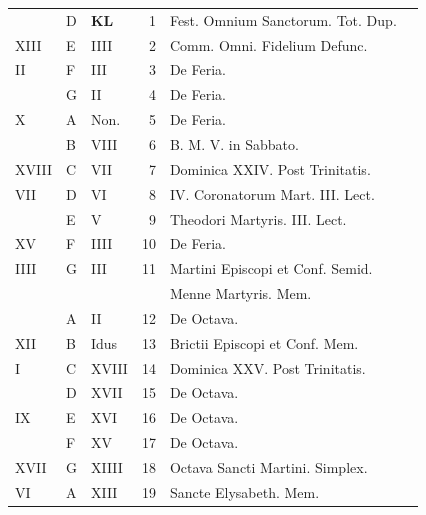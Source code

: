 \begin{center}
\begin{tabular}{l | l | l | r | l l}
\color{Red}  & D & \textbf{\color{Red} K\color{Blue}L} & 1 & Fest. Omnium Sanctorum. Tot. Dup. & \color{Red} \\
\color{Red} XIII & E & \color{Red} IIII & 2 & Comm. Omni. Fidelium Defunc. & \\
\color{Red} II & F & \color{Red} III & 3 & De Feria. & \color{Red} \\
\color{Red}  & G & \color{Red} II & 4 & De Feria. & \color{Red} \\
\color{Red} X & \color{Red} A & \color{Red} Non. & 5 & De Feria. & \color{Red} \\
\color{Red}  & B & \color{Red} VIII & 6 & B. M. V. in Sabbato. & \color{Red} \\
\color{Red} XVIII & C & \color{Red} VII & 7 & Dominica XXIV. Post Trinitatis. & \color{Red} \\
\color{Red} VII & D & \color{Red} VI & 8 & IV. Coronatorum Mart. III. Lect. & \color{Red} \\
\color{Red}  & E & \color{Red} V & 9 & Theodori Martyris. III. Lect. & \color{Red} \\
\color{Red} XV & F & \color{Red} IIII & 10 & De Feria. & \color{Red} \\
\color{Red} IIII & G & \color{Red} III & 11 & \multicolumn{2}{l}{\color{Red} Martini Episcopi et Conf. Semid. } \\
& & & & \quad \color{Red} Menne Martyris. Mem. \color{Red} \\
\color{Red}  & \color{Red} A & \color{Red} II & 12 & De Octava. & \color{Red} \\
\color{Red} XII & B & \color{Red} Idus & 13 & Brictii Episcopi et Conf. Mem. & \color{Red} \\
\color{Red} I & C & \color{Red} XVIII & 14 & Dominica XXV. Post Trinitatis. & \color{Red} \\
\color{Red}  & D & \color{Red} XVII & 15 & De Octava. & \color{Red} \\
\color{Red} IX & E & \color{Red} XVI & 16 & De Octava. & \color{Red} \\
\color{Red}  & F & \color{Red} XV & 17 & De Octava. \\
\color{Red} XVII & G & \color{Red} XIIII & 18 & Octava Sancti Martini. \color{Red} Simplex. \\
\color{Red} VI & \color{Red} A & \color{Red} XIII & 19 & Sancte Elysabeth. Mem. & \color{Red} \\

\end{tabular}
\end{center}
